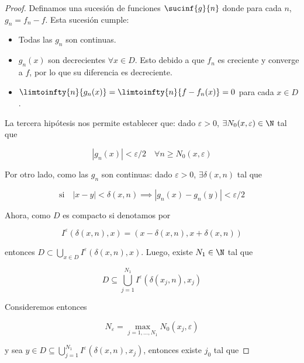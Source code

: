 \begin{proof}
    Definamos una sucesión de funciones $\sucinf{g}{n}$ donde para cada $n$, $g_n = f_n - f$. Esta sucesión cumple:
    
    \begin{itemize}
        \item Todas las $g_n$ son continuas.
        \item $g_n(x)$ son decrecientes $\forall x \in D$. Esto debido a que $f_n$ es creciente y converge a $f$, por lo que su diferencia es decreciente.
        \item $\limtoinfty{n}{g_n(x)} = \limtoinfty{n}{f - f_n(x)} = 0$ para cada $x \in D$.
    \end{itemize}
    
    La tercera hipótesis nos permite establecer que: dado $\varepsilon > 0$, $\exists N_0(x, \varepsilon) \in \N$ tal que
    
    \[
    \left|g_n(x)\right| < \varepsilon/2 \quad \forall n \geq N_0(x, \varepsilon)
    \]
    
    Por otro lado, como las $g_n$ son continuas: dado $\varepsilon > 0$, $\exists \delta(x, n)$ tal que
    
    \[
    \text{si} \quad |x-y| < \delta(x, n) \implies \left|g_n(x) - g_n(y)\right| < \varepsilon/2
    \]
    
    Ahora, como $D$ es compacto si denotamos por
    
    \[
    I^{\varepsilon}\left(\delta(x, n), x\right) = \left(x - \delta(x, n), x + \delta(x, n)\right)
    \]
    
    \noindent entonces $D \subset \bigcup_{x \in D} I^{\varepsilon}\left(\delta(x, n), x\right)$. Luego, existe $N_1 \in \N$ tal que
    
    \[
    D \subseteq \bigcup_{j=1}^{N_1} I^{\varepsilon}\left(\delta(x_j, n), x_j\right)
    \]
    
    Consideremos entonces 
    
    \[
    N_{\varepsilon} = \max_{j = 1, \dots, N_1} N_0(x_j, \varepsilon)
    \]
    
    \noindent y sea $y \in D \subseteq \bigcup_{j=1}^{N_1} I^{\varepsilon}\left(\delta(x, n), x_j\right)$, entonces existe $j_0$ tal que
    

\end{proof}
